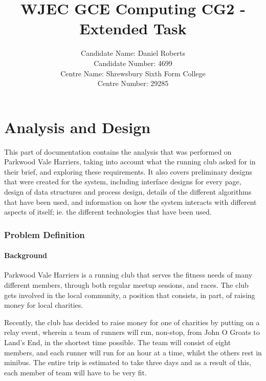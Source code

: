 \documentclass{article}[12pt,a4paper]
\begin{document}
\title{WJEC GCE Computing CG2 - Extended Task}

\author{Candidate Name: Daniel Roberts\\
        Candidate Number: 4699\\
        Centre Name: Shrewsbury Sixth Form College\\
        Centre Number: 29285}

\date{}

\maketitle

\tableofcontents

\cleardoublepage

\part{Analysis and Design}
This part of documentation contains the analysis that was performed on Parkwood Vale Harriers, taking into account what the running club asked for in their brief, and exploring these requirements. It also covers preliminary designs that were created for the system, including interface designs for every page, design of data structures and process design, details of the different algorithms that have been used, and information on how the system interacts with different aspects of itself; ie. the different technologies that have been used.

\section{Problem Definition}
\subsection{Background}
Parkwood Vale Harriers is a running club that serves the fitness needs of many different members, through both regular meetup sessions, and races. The club gets involved in the local community, a position that consists, in part, of raising money for local charities.

Recently, the club has decided to raise money for one of charities by putting on a relay event, wherein a team of runners will run, non-stop, from John O\textsc{} Groats to Land’s End, in the shortest time possible. The team will consist of eight members, and each runner will run for an hour at a time, whilst the others rest in minibus. The entire trip is estimated to take three days and as a result of this, each member of team will have to be very fit.
\end{document}
